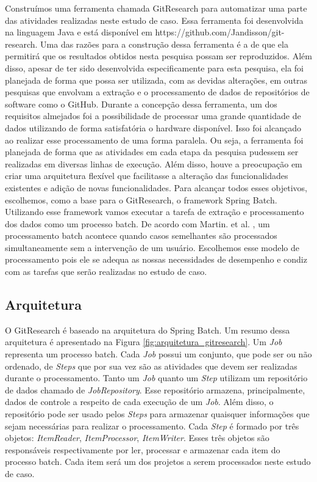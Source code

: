 Construímos uma ferramenta chamada GitResearch para automatizar uma parte das atividades realizadas neste estudo de caso. Essa ferramenta foi desenvolvida na linguagem Java e está disponível em https://github.com/Jandisson/git-research. Uma das razões para a construção dessa ferramenta é a de que ela permitirá que os resultados obtidos nesta pesquisa possam ser reproduzidos.  Além disso, apesar de ter sido desenvolvida especificamente para esta pesquisa, ela foi planejada de forma que possa ser utilizada, com as devidas alterações, em outras pesquisas que envolvam a extração e o  processamento de dados de repositórios de software como o GitHub. Durante a concepção dessa ferramenta, um dos requisitos almejados foi a possibilidade de processar uma grande quantidade de dados utilizando de forma satisfatória o hardware disponível. Isso foi alcançado ao realizar esse processamento de uma forma paralela. Ou seja, a ferramenta foi planejada de forma que as atividades em cada etapa da pesquisa pudessem ser realizadas em diversas linhas de execução. Além disso, houve a preocupação em criar uma arquitetura flexível que facilitasse a alteração das funcionalidades existentes e adição de novas funcionalidades. Para alcançar todos esses objetivos, escolhemos, como a base para o GitResearch, o framework Spring Batch\cite{cogoluegnes2011spring}. Utilizando esse framework vamos executar a tarefa de extração e processamento dos dados como um processo batch. De acordo com Martin. et al. \cite{martin2015batch}, um processamento batch acontece quando casos semelhantes são processados simultaneamente sem a intervenção de um usuário. Escolhemos esse modelo de processamento pois ele se adequa as nossas necessidades de desempenho e condiz com as tarefas que serão realizadas no estudo de caso.



\subsection{Arquitetura}

O GitResearch é baseado na arquitetura do Spring Batch. Um resumo dessa arquitetura é apresentado na Figura \ref{fig:arquitetura_gitresearch}. Um \textit{Job} representa um processo batch. Cada \textit{Job} possui um conjunto, que pode ser ou não ordenado, de \textit{Steps} que por sua vez são as atividades que devem ser realizadas durante o processamento. Tanto um \textit{Job} quanto um \textit{Step} utilizam um repositório de dados chamado de \textit{JobRepository}. Esse repositório armazena, principalmente, dados de controle a respeito de cada execução de um  \textit{Job}. Além disso, o repositório pode ser usado pelos \textit{Steps} para armazenar quaisquer informações que sejam necessárias para realizar o processamento. Cada \textit{Step} é formado por três objetos: \textit{ItemReader}, \textit{ItemProcessor}, \textit{ItemWriter}. Esses três objetos são responsáveis respectivamente por ler, processar e armazenar cada item do processo batch. Cada item será um dos projetos a serem processados neste estudo de caso. 


